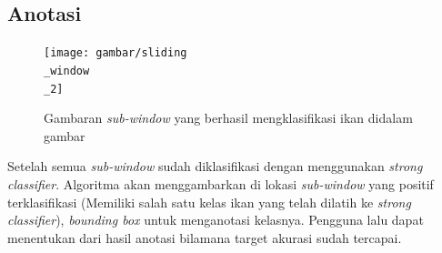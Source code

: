 \subsection{Anotasi}

\begin{figure}[H]
  \centering{}
	\texttt{[image: gambar/sliding\\\_window\\\_2]}
  \caption{Gambaran \textit{sub-window} yang berhasil mengklasifikasi ikan didalam gambar}
\end{figure}

Setelah semua \textit{sub-window} sudah diklasifikasi dengan menggunakan 
\emph{strong classifier}. Algoritma akan menggambarkan di lokasi \textit{sub-window} 
yang positif terklasifikasi (Memiliki salah satu kelas ikan yang telah dilatih ke \emph{strong classifier}), 
\emph{bounding box} untuk menganotasi kelasnya. Pengguna lalu dapat menentukan 
dari hasil anotasi bilamana target akurasi sudah tercapai.


